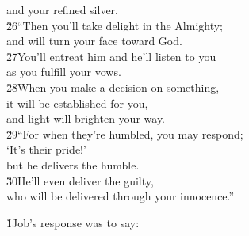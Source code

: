 \begin{poetry}
\poemll    and your refined silver. \\
\poeml \v{26}``Then you'll take delight in the Almighty; \\
\poemll    and will turn your face toward God. \\
\poeml \v{27}You'll entreat him and he'll listen to you \\
\poemll    as you fulfill your vows. \\
\poeml \v{28}When you make a decision on something, \\
\poemll    it will be established for you, \\
\poemlll       and light will brighten your way. \\
\poeml \v{29}``For when they're humbled, you may respond; \\
\poemll    `It's their pride!' \\
\poemlll       but he delivers the humble. \\
\poeml \v{30}He'll even deliver the guilty, \\
\poemll    who will be delivered through your innocence.''
\end{poetry}

\v{1}Job's response was to say:


